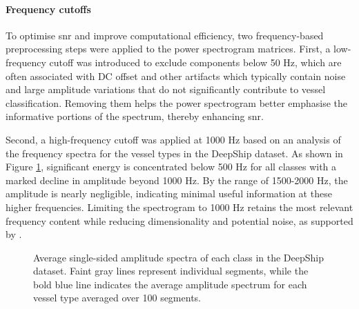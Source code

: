 \paragraph{Frequency cutoffs}
To optimise \acrshort{snr} and improve computational efficiency, two frequency-based preprocessing steps were applied to the power spectrogram matrices. First, a low-frequency cutoff was introduced to exclude components below 50 Hz, which are often associated with DC offset and other artifacts which typically contain noise and large amplitude variations that do not significantly contribute to vessel classification. Removing them helps the power spectrogram better emphasise the informative portions of the spectrum, thereby enhancing \acrshort{snr}.

Second, a high-frequency cutoff was applied at 1000 Hz based on an analysis of the frequency spectra for the vessel types in the DeepShip dataset. As shown in Figure \ref{fig:freq-ampl-highf}, significant energy is concentrated below 500 Hz for all classes with a marked decline in amplitude beyond 1000 Hz. By the range of 1500-2000 Hz, the amplitude is nearly negligible, indicating minimal useful information at these higher frequencies. Limiting the spectrogram to 1000 Hz retains the most relevant frequency content while reducing dimensionality and potential noise, as supported by \cite{premus_machine_2020}.

\begin{figure}[htbp]
    \centering
    \caption{Average single-sided amplitude spectra of each class in the DeepShip dataset. Faint gray lines represent individual segments, while the bold blue line indicates the average amplitude spectrum for each vessel type averaged over 100 segments.}
    \label{fig:freq-ampl-highf}
\end{figure}

